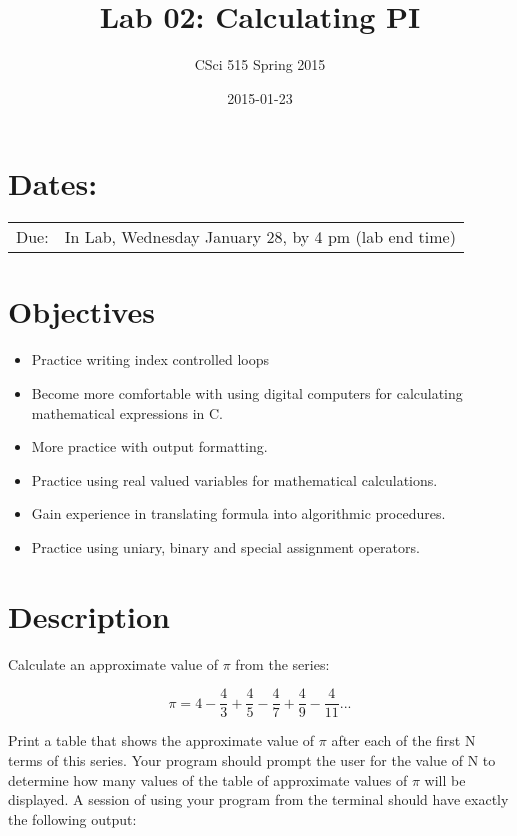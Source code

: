 \documentclass[11pt]{article}
\title{Lab 02: Calculating PI}
\author{CSci 515 Spring 2015}
\date{2015-01-23}
\begin{document}
\maketitle


\section*{Dates:}
\label{sec-1}


\begin{center}
\begin{tabular}{ll}
 Due:  &  In Lab, Wednesday January 28, by 4 pm (lab end time)  \\
\end{tabular}
\end{center}
\section*{Objectives}
\label{sec-2}

\begin{itemize}
\item Practice writing index controlled loops
\item Become more comfortable with using digital computers for calculating mathematical expressions in C.
\item More practice with output formatting.
\item Practice using real valued variables for mathematical calculations.
\item Gain experience in translating formula into algorithmic procedures.
\item Practice using uniary, binary and special assignment operators.
\end{itemize}
\section*{Description}
\label{sec-3}

Calculate an approximate value of $\pi$ from the series:

$$ \pi = 4 - \frac{4}{3} + \frac{4}{5} - \frac{4}{7} + \frac{4}{9} - \frac{4}{11} ... $$

Print a table that shows the approximate value of $\pi$ after each of
the first N terms of this series.  Your program should prompt the user
for the value of N to determine how many values of the table of
approximate values of $\pi$ will be displayed.  A session of using
your program from the terminal should have exactly the following
output:
\end{document}
